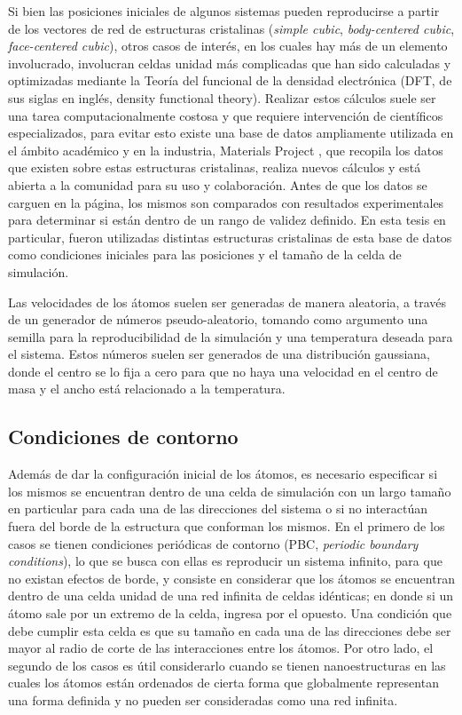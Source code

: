 Si bien las posiciones iniciales de algunos sistemas pueden reproducirse a partir
de los vectores de red de estructuras cristalinas (\textit{simple cubic}, 
\textit{body-centered cubic}, \textit{face-centered cubic}), otros casos de
interés, en los cuales hay más de un elemento involucrado, involucran celdas 
unidad más complicadas que han sido calculadas y optimizadas mediante la Teoría
del funcional de la densidad electrónica (DFT, de sus siglas en inglés, density 
functional theory). Realizar estos cálculos suele ser una tarea computacionalmente 
costosa y que requiere intervención de científicos especializados, para evitar esto
existe una base de datos ampliamente utilizada en el ámbito académico y en
la industria, Materials Project \cite{materials_project}, que recopila los datos
que existen sobre estas estructuras cristalinas, realiza nuevos cálculos y está 
abierta a la comunidad para su uso y colaboración. Antes de que los datos se
carguen en la página, los mismos son comparados con resultados experimentales 
para determinar si están dentro de un rango de validez definido. En esta tesis
en particular, fueron utilizadas distintas estructuras cristalinas de esta base de
datos como condiciones iniciales para las posiciones y el tamaño de la celda de 
simulación.

Las velocidades de los átomos suelen ser generadas de manera aleatoria, a través
de un generador de números pseudo-aleatorio, tomando como argumento una semilla 
para la reproducibilidad de la simulación y una temperatura deseada para el
sistema. Estos números suelen ser generados de una distribución gaussiana, donde
el centro se lo fija a cero para que no haya una velocidad en el centro de masa
y el ancho está relacionado a la temperatura.

\subsection{Condiciones de contorno}

Además de dar la configuración inicial de los átomos, es necesario especificar si
los mismos se encuentran dentro de una celda de simulación con un largo tamaño en
particular para cada una de las direcciones del sistema o si no interactúan fuera
del borde de la estructura que conforman los mismos. En el primero de los casos
se tienen condiciones periódicas de contorno (PBC, \textit{periodic boundary 
conditions}), lo que se busca con ellas es reproducir un sistema infinito, para
que no existan efectos de borde, y consiste en considerar que los átomos se 
encuentran dentro de una celda unidad de una red infinita de celdas idénticas; en
donde si un átomo sale por un extremo de la celda, ingresa por el opuesto. Una
condición que debe cumplir esta celda es que su tamaño en cada una de las 
direcciones debe ser mayor al radio de corte de las interacciones entre los átomos. 
Por otro lado, el segundo de los casos es útil considerarlo cuando se 
tienen nanoestructuras en las cuales los átomos están ordenados de cierta forma 
que globalmente representan una forma definida y no pueden ser consideradas como
una red infinita.

